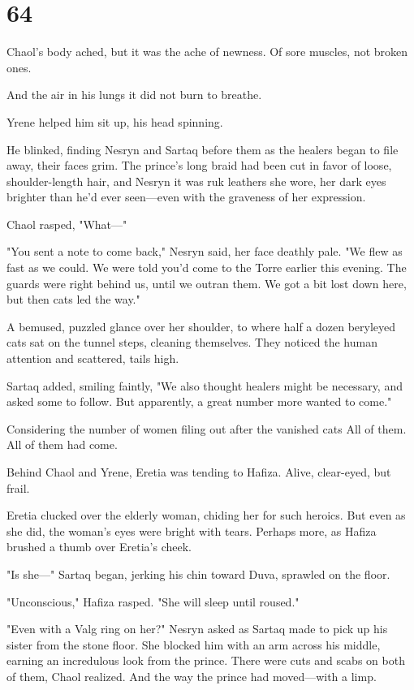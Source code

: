 
\chapter{64}

Chaol's body ached, but it was the ache of newness. Of sore muscles, not broken ones.

And the air in his lungs  it did not burn to breathe.

Yrene helped him sit up, his head spinning.

He blinked, finding Nesryn and Sartaq before them as the healers began to file away, their faces grim. The prince's long braid had been cut in favor of loose, shoulder-length hair, and Nesryn  it was ruk leathers she wore, her dark eyes brighter than he'd ever seen---even with the graveness of her expression.

Chaol rasped, "What---"

"You sent a note to come back," Nesryn said, her face deathly pale. "We flew as fast as we could. We were told you'd come to the Torre earlier this evening. The guards were right behind us, until we outran them. We got a bit lost down here, but then  cats led the way."

A bemused, puzzled glance over her shoulder, to where half a dozen beryleyed cats sat on the tunnel steps, cleaning themselves. They noticed the human attention and scattered, tails high.

Sartaq added, smiling faintly, "We also thought healers might be necessary, and asked some to follow. But apparently, a great number more wanted to come."

Considering the number of women filing out after the vanished cats
 All of them. All of them had come.

Behind Chaol and Yrene, Eretia was tending to Hafiza. Alive, clear-eyed, but  frail.

Eretia clucked over the elderly woman, chiding her for such heroics. But even as she did, the woman's eyes were bright with tears. Perhaps more, as Hafiza brushed a thumb over Eretia's cheek.

"Is she---" Sartaq began, jerking his chin toward Duva, sprawled on the floor.

"Unconscious," Hafiza rasped. "She will sleep until roused."

"Even with a Valg ring on her?" Nesryn asked as Sartaq made to pick up his sister from the stone floor. She blocked him with an arm across his middle, earning an incredulous look from the prince. There were cuts and scabs on both of them, Chaol realized. And the way the prince had moved---with a limp.

